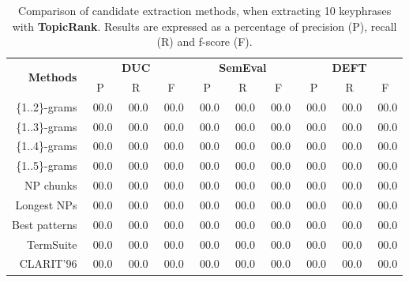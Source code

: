     \begin{table}[h]
      \centering
      \begin{tabular}{rccccccccc}
        \toprule
        \multirow{2}{*}[-2pt]{\textbf{Methods}} & \multicolumn{3}{c}{\textbf{DUC}} & \multicolumn{3}{c}{\textbf{SemEval}} & \multicolumn{3}{c}{\textbf{DEFT}}\\
        \cmidrule(r){2-4}\cmidrule(lr){5-7}\cmidrule(l){8-10}
        & P & R & F & P & R & F & P & R & F\\
        \midrule
        \{1..2\}-grams & ${~~}$00.0 & ${~~}$00.0 & ${~~}$00.0 & ${~~}$00.0 & ${~~}$00.0 & ${~~}$00.0 & ${~~}$00.0 & ${~~}$00.0 & ${~~}$00.0\\
        \{1..3\}-grams & ${~~}$00.0 & ${~~}$00.0 & ${~~}$00.0 & ${~~}$00.0 & ${~~}$00.0 & ${~~}$00.0 & ${~~}$00.0 & ${~~}$00.0 & ${~~}$00.0\\
        \{1..4\}-grams & ${~~}$00.0 & ${~~}$00.0 & ${~~}$00.0 & ${~~}$00.0 & ${~~}$00.0 & ${~~}$00.0 & ${~~}$00.0 & ${~~}$00.0 & ${~~}$00.0\\
        \{1..5\}-grams & ${~~}$00.0 & ${~~}$00.0 & ${~~}$00.0 & ${~~}$00.0 & ${~~}$00.0 & ${~~}$00.0 & ${~~}$00.0 & ${~~}$00.0 & ${~~}$00.0\\
        NP chunks & ${~~}$00.0 & ${~~}$00.0 & ${~~}$00.0 & ${~~}$00.0 & ${~~}$00.0 & ${~~}$00.0 & ${~~}$00.0 & ${~~}$00.0 & ${~~}$00.0\\
        Longest NPs & ${~~}$00.0 & ${~~}$00.0 & ${~~}$00.0 & ${~~}$00.0 & ${~~}$00.0 & ${~~}$00.0 & ${~~}$00.0 & ${~~}$00.0 & ${~~}$00.0\\
        Best patterns & ${~~}$00.0 & ${~~}$00.0 & ${~~}$00.0 & ${~~}$00.0 & ${~~}$00.0 & ${~~}$00.0 & ${~~}$00.0 & ${~~}$00.0 & ${~~}$00.0\\
        TermSuite & ${~~}$00.0 & ${~~}$00.0 & ${~~}$00.0 & ${~~}$00.0 & ${~~}$00.0 & ${~~}$00.0 & ${~~}$00.0 & ${~~}$00.0 & ${~~}$00.0\\
        CLARIT'96 & ${~~}$00.0 & ${~~}$00.0 & ${~~}$00.0 & ${~~}$00.0 & ${~~}$00.0 & ${~~}$00.0 & ${~~}$00.0 & ${~~}$00.0 & ${~~}$00.0\\
        \bottomrule
      \end{tabular}
      \caption{Comparison of candidate extraction methods, when extracting 10
               keyphrases with \textbf{TopicRank}. Results are expressed as a
               percentage of precision (P), recall (R) and f-score (F).
               \label{tab:keyphrase_extraction_results}}
    \end{table}

